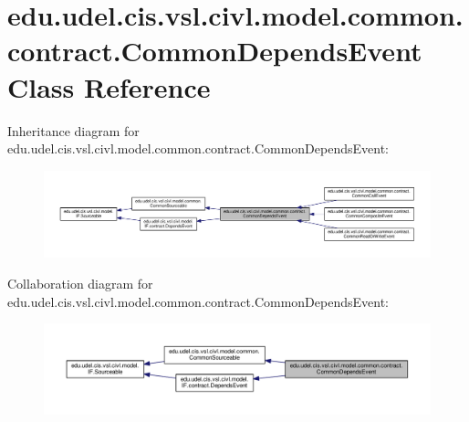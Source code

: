 \hypertarget{classedu_1_1udel_1_1cis_1_1vsl_1_1civl_1_1model_1_1common_1_1contract_1_1CommonDependsEvent}{}\section{edu.\+udel.\+cis.\+vsl.\+civl.\+model.\+common.\+contract.\+Common\+Depends\+Event Class Reference}
\label{classedu_1_1udel_1_1cis_1_1vsl_1_1civl_1_1model_1_1common_1_1contract_1_1CommonDependsEvent}


Inheritance diagram for edu.\+udel.\+cis.\+vsl.\+civl.\+model.\+common.\+contract.\+Common\+Depends\+Event\+:
\nopagebreak
\begin{figure}[H]
\begin{center}
\leavevmode
\includegraphics[width=350pt]{classedu_1_1udel_1_1cis_1_1vsl_1_1civl_1_1model_1_1common_1_1contract_1_1CommonDependsEvent__inherit__graph}
\end{center}
\end{figure}


Collaboration diagram for edu.\+udel.\+cis.\+vsl.\+civl.\+model.\+common.\+contract.\+Common\+Depends\+Event\+:
\nopagebreak
\begin{figure}[H]
\begin{center}
\leavevmode
\includegraphics[width=350pt]{classedu_1_1udel_1_1cis_1_1vsl_1_1civl_1_1model_1_1common_1_1contract_1_1CommonDependsEvent__coll__graph}
\end{center}
\end{figure}
